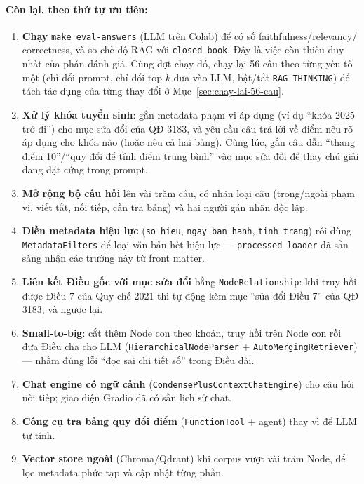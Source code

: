 \paragraph{Còn lại, theo thứ tự ưu tiên:}
\begin{enumerate}
  \item \textbf{Chạy} \texttt{make eval-answers} (LLM trên Colab) để có số faithfulness/relevancy/
        correctness, và so chế độ RAG với \texttt{closed-book}. Đây là việc còn thiếu duy nhất của
        phần đánh giá. Cùng đợt chạy đó, chạy lại 56 câu theo từng yếu tố một (chỉ đổi prompt, chỉ đổi
        top-$k$ đưa vào LLM, bật/tắt \texttt{RAG\_THINKING}) để tách tác dụng của từng thay đổi ở
        Mục~\ref{sec:chay-lai-56-cau}.
  \item \textbf{Xử lý khóa tuyển sinh}: gắn metadata phạm vi áp dụng (ví dụ ``khóa 2025 trở đi'') cho
        mục sửa đổi của QĐ 3183, và yêu cầu câu trả lời về điểm nêu rõ áp dụng cho khóa nào (hoặc nêu
        cả hai bảng). Cùng lúc, gắn câu dẫn ``thang điểm 10''/``quy đổi để tính điểm trung bình'' vào
        mục sửa đổi để thay chú giải đang đặt cứng trong prompt.
  \item \textbf{Mở rộng bộ câu hỏi} lên vài trăm câu, có nhãn loại câu (trong/ngoài phạm vi, viết tắt,
        nối tiếp, cần tra bảng) và hai người gán nhãn độc lập.
  \item \textbf{Điền metadata hiệu lực} (\texttt{so\_hieu}, \texttt{ngay\_ban\_hanh}, \texttt{tinh\_trang})
        rồi dùng \texttt{MetadataFilters} để loại văn bản hết hiệu lực --- \texttt{processed\_loader}
        đã sẵn sàng nhận các trường này từ front matter.
  \item \textbf{Liên kết Điều gốc với mục sửa đổi} bằng \texttt{NodeRelationship}: khi truy hồi được
        Điều 7 của Quy chế 2021 thì tự động kèm mục ``sửa đổi Điều 7'' của QĐ 3183, và ngược lại.
  \item \textbf{Small-to-big}: cắt thêm Node con theo khoản, truy hồi trên Node con rồi đưa Điều cha
        cho LLM (\texttt{HierarchicalNodeParser} + \texttt{AutoMergingRetriever}) --- nhắm đúng lỗi
        ``đọc sai chi tiết số'' trong Điều dài.
  \item \textbf{Chat engine có ngữ cảnh} (\texttt{CondensePlusContextChatEngine}) cho câu hỏi nối tiếp;
        giao diện Gradio đã có sẵn lịch sử chat.
  \item \textbf{Công cụ tra bảng quy đổi điểm} (\texttt{FunctionTool} + agent) thay vì để LLM tự tính.
  \item \textbf{Vector store ngoài} (Chroma/Qdrant) khi corpus vượt vài trăm Node, để lọc metadata
        phức tạp và cập nhật từng phần.
\end{enumerate}


